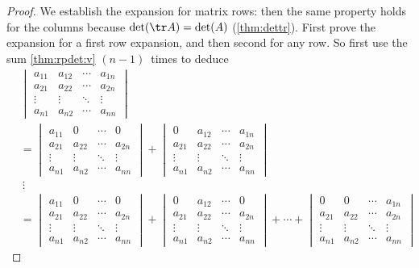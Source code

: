\begin{proof} 
We establish the expansion for matrix rows: then the same property holds for the columns because \(\det(\tr A)=\det(A)\) (\cref{thm:dettr}).
First prove the expansion for a first row expansion, and then second for any row.
So first use the sum \cref{thm:rpdet:v} \((n-1)\)~times to deduce
\begin{align*}&
\begin{vmatrix} a_{11}&a_{12}&\cdots&a_{1n}
\\ a_{21}&a_{22}&\cdots&a_{2n}
\\ \vdots&\vdots&\ddots&\vdots
\\ a_{n1}&a_{n2}&\cdots&a_{nn}
\end{vmatrix}
\\&=
\begin{vmatrix} a_{11}&0&\cdots&0
\\ a_{21}&a_{22}&\cdots&a_{2n}
\\ \vdots&\vdots&\ddots&\vdots
\\ a_{n1}&a_{n2}&\cdots&a_{nn}
\end{vmatrix}
+\begin{vmatrix} 0&a_{12}&\cdots&a_{1n}
\\ a_{21}&a_{22}&\cdots&a_{2n}
\\ \vdots&\vdots&\ddots&\vdots
\\ a_{n1}&a_{n2}&\cdots&a_{nn}
\end{vmatrix}
\\&\ \vdots
\\&=
\begin{vmatrix} a_{11}&0&\cdots&0
\\ a_{21}&a_{22}&\cdots&a_{2n}
\\ \vdots&\vdots&\ddots&\vdots
\\ a_{n1}&a_{n2}&\cdots&a_{nn}
\end{vmatrix}
+\begin{vmatrix} 0&a_{12}&\cdots&0
\\ a_{21}&a_{22}&\cdots&a_{2n}
\\ \vdots&\vdots&\ddots&\vdots
\\ a_{n1}&a_{n2}&\cdots&a_{nn}
\end{vmatrix}
+\cdots
+\begin{vmatrix} 0&0&\cdots&a_{1n}
\\ a_{21}&a_{22}&\cdots&a_{2n}
\\ \vdots&\vdots&\ddots&\vdots
\\ a_{n1}&a_{n2}&\cdots&a_{nn}
\end{vmatrix}

\end{align*}
\end{proof}
